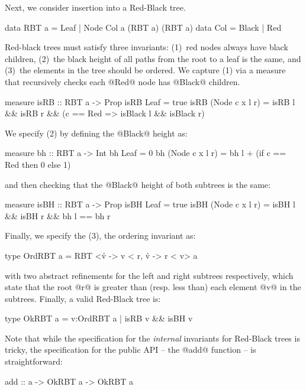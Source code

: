 %
Next, we consider insertion into a Red-Black tree.
%
\begin{code}
  data RBT a = Leaf  | Node Col a (RBT a) (RBT a)
  data Col   = Black | Red
\end{code}
%
Red-black trees must satisfy three invariants:
%
(1)~red nodes always have black children,
(2)~the black height of all paths from the root to a leaf is the same, and
(3)~the elements in the tree should be ordered.
%
We capture (1) via a measure that recursively checks each @Red@ node has @Black@ children.
%
\begin{code}
  measure isRB :: RBT a -> Prop
  isRB Leaf           = true
  isRB (Node c x l r) = isRB l && isRB r &&
                        (c == Red => isBlack l && isBlack r)
\end{code}
%
We specify (2) by defining the @Black@ height as:
%
\begin{code}
  measure bh :: RBT a -> Int
  bh Leaf           = 0
  bh (Node c x l r) = bh l + (if c == Red then 0 else 1)
\end{code}
%
and then checking that the @Black@ height of both subtrees is the same:
%
\begin{code}
  measure isBH :: RBT a -> Prop
  isBH Leaf           = true
  isBH (Node c x l r) = isBH l && isBH r && bh l == bh r
\end{code}
%
Finally, we specify the (3), the ordering invariant as:
%
\begin{code}
  type OrdRBT a = RBT <{\r v -> v < r}, {\r v -> r < v}> a
\end{code}
%
\ie with two abstract refinements for the left and right subtrees
respectively, which state that the root @r@ is greater than (resp. less than)
each element @v@ in the subtrees. Finally, a valid Red-Black tree is:
%
\begin{code}
  type OkRBT a = {v:OrdRBT a | isRB v && isBH v}
\end{code}
%
Note that while the specification for the \emph{internal} invariants for Red-Black
trees is tricky, the specification for the public API -- \eg the @add@ function -- 
is straightforward:
%
\begin{code}
  add :: a -> OkRBT a -> OkRBT a
\end{code}

